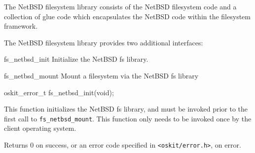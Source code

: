%
% 
%
\label{netbsd-fs}

The NetBSD filesystem library consists of the NetBSD filesystem code
and a collection of glue code which encapsulates the NetBSD
code within the \oskit{} filesystem framework.

The NetBSD filesystem library provides two additional interfaces:
\begin{csymlist}
\item[fs_netbsd_init]
	Initialize the NetBSD fs library.
\item[fs_netbsd_mount]
	Mount a filesystem via the NetBSD fs library
\end{csymlist}

\begin{apisyn}

	\funcproto oskit_error_t
		   fs_netbsd_init(void);
\end{apisyn}
\ostofs
\begin{apidesc}
	This function initializes the NetBSD fs library,
	and must be invoked prior to the first
	call to {\tt fs_netbsd_mount}.  This function only
	needs to be invoked once by the client
	operating system.
\end{apidesc}
\begin{apiret}
	Returns 0 on success, or an error code specified in
	{\tt <oskit/error.h>}, on error.
\end{apiret}



